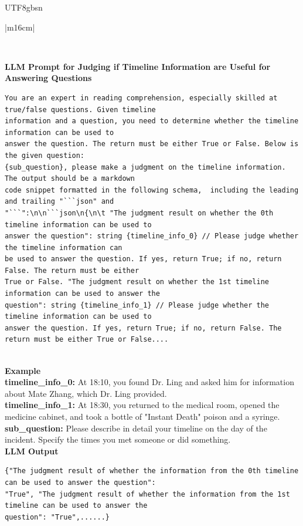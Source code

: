 \documentclass[11pt]{article}
\begin{document}
{\begin{CJK}{UTF8}{gbsn}
\begin{table}[ht!]
\begin{minipage}[t]{\linewidth}
\begin{tabular}{|m{16cm}|}
\begin{minipage}[t]{\linewidth}
\begin{verbatim}
\end{verbatim}
\end{minipage} \\
\hline
{}  {\textbf{LLM Prompt for Judging if Timeline Information are Useful for Answering Questions}} \\
\begin{minipage}[t]{\linewidth}
\small \begin{verbatim}
You are an expert in reading comprehension, especially skilled at true/false questions. Given timeline
information and a question, you need to determine whether the timeline information can be used to 
answer the question. The return must be either True or False. Below is the given question: 
{sub_question}, please make a judgment on the timeline information. The output should be a markdown
code snippet formatted in the following schema,  including the leading and trailing "```json" and 
"```":\n\n```json\n{\n\t "The judgment result on whether the 0th timeline information can be used to 
answer the question": string {timeline_info_0} // Please judge whether the timeline information can 
be used to answer the question. If yes, return True; if no, return False. The return must be either 
True or False. "The judgment result on whether the 1st timeline information can be used to answer the
question": string {timeline_info_1} // Please judge whether the timeline information can be used to 
answer the question. If yes, return True; if no, return False. The return must be either True or False....

\end{verbatim}
\end{minipage} \\

\hline
{}  \textbf{Example}  \\
 \textbf{  timeline\_info\_0:} \small At 18:10, you found Dr. Ling and asked him for information about Mate Zhang, which Dr. Ling provided.\\
  \textbf{  timeline\_info\_1:} \small At 18:30, you returned to the medical room, opened the medicine cabinet, and took a bottle of "Instant Death" poison and a syringe.\\
    \textbf{  sub\_question:} \small Please describe in detail your timeline on the day of the incident. Specify the times you met someone or did something.  \\
  \textbf{LLM Output}  \\
\hline
\begin{minipage}[t]{\linewidth}
\small\begin{verbatim}
{"The judgment result of whether the information from the 0th timeline can be used to answer the question": 
"True", "The judgment result of whether the information from the 1st timeline can be used to answer the 
question": "True",......}


\end{verbatim}
\end{minipage}
\end{tabular}
\end{minipage}
\end{table}
\end{CJK}}
\end{document}
